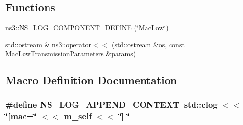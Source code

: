 \subsection*{Functions}
\begin{DoxyCompactItemize}
\item 
\hyperlink{namespacens3_ab7783849d590e5f5c11d2d8c8c63fd8a}{ns3\+::\+N\+S\+\_\+\+L\+O\+G\+\_\+\+C\+O\+M\+P\+O\+N\+E\+N\+T\+\_\+\+D\+E\+F\+I\+NE} (\char`\"{}Mac\+Low\char`\"{})
\item 
std\+::ostream \& \hyperlink{namespacens3_a17416fd3f724a641f85376500de5944a}{ns3\+::operator$<$$<$} (std\+::ostream \&os, const Mac\+Low\+Transmission\+Parameters \&params)
\end{DoxyCompactItemize}


\subsection{Macro Definition Documentation}
\subsubsection[{\texorpdfstring{N\+S\+\_\+\+L\+O\+G\+\_\+\+A\+P\+P\+E\+N\+D\+\_\+\+C\+O\+N\+T\+E\+XT}{NS_LOG_APPEND_CONTEXT}}]{\setlength{\rightskip}{0pt plus 5cm}\#define N\+S\+\_\+\+L\+O\+G\+\_\+\+A\+P\+P\+E\+N\+D\+\_\+\+C\+O\+N\+T\+E\+XT~std\+::clog $<$$<$ \char`\"{}\mbox{[}mac=\char`\"{} $<$$<$ m\+\_\+self $<$$<$ \char`\"{}\mbox{]} \char`\"{}}\hypertarget{mac-low_8cc_abe50035652d407c40bdaef78214c4955}{}\label{mac-low_8cc_abe50035652d407c40bdaef78214c4955}
